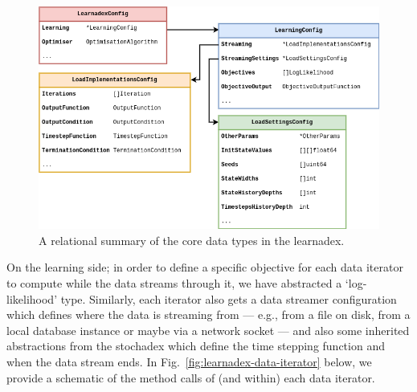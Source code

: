 \begin{figure}[h]
\centering
\includegraphics[width=12cm]{images/chapter-4-learnadex-data-types.drawio.png}
\caption{A relational summary of the core data types in the learnadex.}
\label{fig:learnadex-data-types-design}
\end{figure}

On the learning side; in order to define a specific objective for each data iterator to compute while the data streams through it, we have abstracted a `log-likelihood' type. Similarly, each iterator also gets a data streamer configuration which defines where the data is streaming from --- e.g., from a file on disk, from a local database instance or maybe via a network socket --- and also some inherited abstractions from the stochadex which define the time stepping function and when the data stream ends. In Fig.~\ref{fig:learnadex-data-iterator} below, we provide a schematic of the method calls of (and within) each data iterator.

